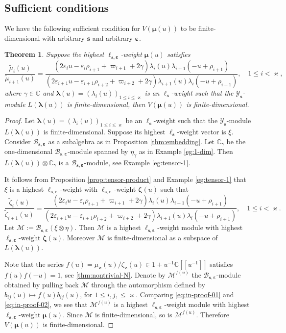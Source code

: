 \documentclass[11pt,reqno]{amsart}
\numberwithin{equation}{section}
\newtheorem{thm}{Theorem}[section]
\theoremstyle{definition}
\theoremstyle{remark}
\newcommand{\beq}{\begin{equation}}
\newcommand{\eeq}{\end{equation}}
\newcommand{\C}{\mathbb{C}}
\newcommand{\mc}{\mathcal}
\newcommand{\bC}{\mathbb{C}}
\newcommand{\tl}{\tilde}
\newcommand{\lle}{\leqslant}
\newcommand{\la}{\lambda}
\newcommand{\bla}{\bm\lambda}
\newcommand{\YMN}{{\mathscr{Y}_{\bm s}}}
\newcommand{\BMN}{{\mathscr{B}_{\bm s,\bm \ve}}}
\newcommand{\ka}{\varkappa}
\newcommand{\ve}{\varepsilon}
\newcommand{\s}{{\bm s}}
\begin{document}
\subsection{Sufficient conditions}
We have the following sufficient condition for $V(\bm\mu(u))$ to be finite-dimensional with arbitrary $\s$ and arbitrary $\bm\ve$.
\begin{thm}\label{thm:suff}
Suppose the highest $\ell_{\s,\bm\ve}$-weight $\bm\mu(u)$ satisfies
\beq\label{eq:in-proof-01}
\frac{\tl \mu_i(u)}{\tl \mu_{i+1}(u)}=\frac{(2\ve_{i}u-\ve_{i}\rho_{i+1}+\varpi_{i+1}+2\gamma)\la_i(u) \la_{i+1}(-u+\rho_{i+1})}{(2\ve_{i+1}u-\ve_{i+1}\rho_{i+2}+\varpi_{i+2}+2\gamma)\la_{i+1}(u)\la_i(-u+\rho_{i+1})},\quad 1\lle i<\ka,
\eeq
where $\gamma\in\bC$ and $\bm\la(u)=(\la_i(u))_{1\lle i\lle \ka}$ is an  $\ell_\s$-weight such that the $\YMN$-module $L(\bla(u))$ is finite-dimensional, then $V(\bm\mu(u))$ is finite-dimensional.
\end{thm}
\begin{proof}
Let $\bm\la(u)=(\la_i(u))_{1\lle i\lle \ka}$ be an  $\ell_\s$-weight such that the $\YMN$-module $L(\bla(u))$ is finite-dimensional. Suppose its highest $\ell_\s$-weight vector is $\xi$. Consider $\BMN$ as a subalgebra as in Proposition \ref{thm:embedding}. Let $\bC_{\gamma}$ be the one-dimensional $\BMN$-module spanned by $\eta_\gamma$ as in Example \ref{eg:1-dim}. Then $L(\bla(u))\otimes \bC_\gamma$ is a $\BMN$-module, see Example \ref{eg:tensor-1}.

It follows from Proposition \ref{prop:tensor-product} and Example \ref{eg:tensor-1} that $\xi$ is a highest $\ell_{\s,\bm\ve}$-weight with $\ell_{\s,\bm\ve}$-weight $\bm\zeta(u)$ such that
\beq\label{eq:in-proof-02}
\frac{\tl \zeta_i(u)}{\tl \zeta_{i+1}(u)}=\frac{(2\ve_{i}u-\ve_{i}\rho_{i+1}+\varpi_{i+1}+2\gamma)\la_i(u) \la_{i+1}(-u+\rho_{i+1})}{(2\ve_{i+1}u-\ve_{i+1}\rho_{i+2}+\varpi_{i+2}+2\gamma)\la_{i+1}(u)\la_i(-u+\rho_{i+1})},\quad 1\lle i<\ka.
\eeq
Let $\mathcal M:=\BMN (\xi\otimes\eta)$. Then $\mathcal M$ is a  highest $\ell_{\s,\bm\ve}$-weight module with highest $\ell_{\s,\bm\ve}$-weight $\bm\zeta(u)$. Moreover $\mc M$ is finite-dimensional as a subspace of $L(\bla(u))$.

Note that the series $f(u)=\mu_{\ka}(u)/\zeta_{\ka}(u)\in 1+u^{-1}\C[[u^{-1}]]$ satisfies $f(u)f(-u)=1$, see \eqref{thm:nontrivial-N}. Denote by $\mc M^{f(u)}$ the $\BMN$-module obtained by pulling back $\mc M$ through the automorphism defined by $b_{ij}(u)\mapsto f(u)b_{ij}(u)$, for $1\lle i,j,\lle \ka$. Comparing \eqref{eq:in-proof-01} and \eqref{eq:in-proof-02}, we see that $\mathcal M^{f(u)}$ is a  highest $\ell_{\s,\bm\ve}$-weight module with highest $\ell_{\s,\bm\ve}$-weight $\bm\mu(u)$. Since $\mc M$ is finite-dimensional, so is $\mathcal M^{f(u)}$. Therefore $V(\bm\mu(u))$ is finite-dimensional.
 \end{proof}
\end{document}
